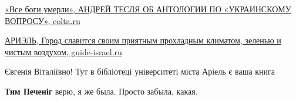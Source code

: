 \begin{itemize}
\begin{itemize}
\href{https://www.colta.ru/articles/literature/11245-vse-bogi-umerli}{%
«Все боги умерли», АНДРЕЙ ТЕСЛЯ ОБ АНТОЛОГИИ ПО «УКРАИНСКОМУ ВОПРОСУ», colta.ru%
}

\end{itemize} %


\href{https://guide-israel.ru/places/10239-ариэль/}{%
АРИЭЛЬ, Город славится своим приятным прохладным климатом, зеленью и чистым воздухом, guide-israel.ru%
}

Євгенія Віталіївно! Тут в бібліотеці університеті міста Аріель є ваша книга

\textbf{Тим Печеніг} верю, я же была. Просто забыла, какая.

\end{itemize} %
